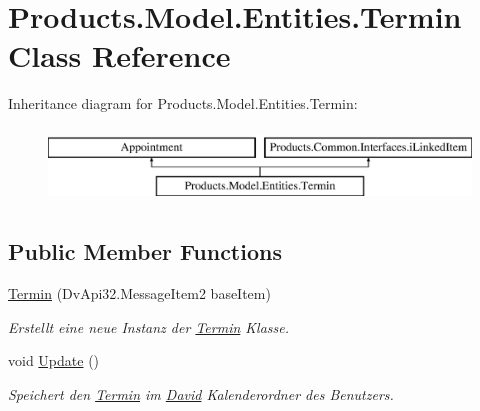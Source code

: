 \hypertarget{class_products_1_1_model_1_1_entities_1_1_termin}{}\section{Products.\+Model.\+Entities.\+Termin Class Reference}
\label{class_products_1_1_model_1_1_entities_1_1_termin}
Inheritance diagram for Products.\+Model.\+Entities.\+Termin\+:\begin{figure}[H]
\begin{center}
\leavevmode
\includegraphics[height=2.000000cm]{class_products_1_1_model_1_1_entities_1_1_termin}
\end{center}
\end{figure}
\subsection*{Public Member Functions}
\begin{DoxyCompactItemize}
\item 
\hyperlink{class_products_1_1_model_1_1_entities_1_1_termin_a3547f75ab5b1d88c051efc8ff2c06de0}{Termin} (Dv\+Api32.\+Message\+Item2 base\+Item)
\begin{DoxyCompactList}\small\item\em Erstellt eine neue Instanz der \hyperlink{class_products_1_1_model_1_1_entities_1_1_termin}{Termin} Klasse. \end{DoxyCompactList}\item 
void \hyperlink{class_products_1_1_model_1_1_entities_1_1_termin_a235b8ce73cbe32945b2f7bf69dd4c1ad}{Update} ()
\begin{DoxyCompactList}\small\item\em Speichert den \hyperlink{class_products_1_1_model_1_1_entities_1_1_termin}{Termin} im \hyperlink{namespace_david}{David} Kalenderordner des Benutzers. \end{DoxyCompactList}\end{DoxyCompactItemize}
